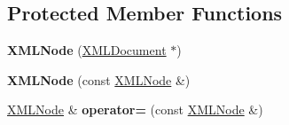 \subsection*{Protected Member Functions}
\begin{DoxyCompactItemize}
\item 
\hypertarget{classtinyxml2_1_1_x_m_l_node_a29868df6ca383d574f584dfdd15105b6}{{\bfseries X\-M\-L\-Node} (\hyperlink{classtinyxml2_1_1_x_m_l_document}{X\-M\-L\-Document} $\ast$)}\label{classtinyxml2_1_1_x_m_l_node_a29868df6ca383d574f584dfdd15105b6}

\item 
\hypertarget{classtinyxml2_1_1_x_m_l_node_a78be01384518a969da905548f318d75b}{{\bfseries X\-M\-L\-Node} (const \hyperlink{classtinyxml2_1_1_x_m_l_node}{X\-M\-L\-Node} \&)}\label{classtinyxml2_1_1_x_m_l_node_a78be01384518a969da905548f318d75b}

\item 
\hypertarget{classtinyxml2_1_1_x_m_l_node_ade79231d908e1f21862819e00e56ab6e}{\hyperlink{classtinyxml2_1_1_x_m_l_node}{X\-M\-L\-Node} \& {\bfseries operator=} (const \hyperlink{classtinyxml2_1_1_x_m_l_node}{X\-M\-L\-Node} \&)}\label{classtinyxml2_1_1_x_m_l_node_ade79231d908e1f21862819e00e56ab6e}

\end{DoxyCompactItemize}
